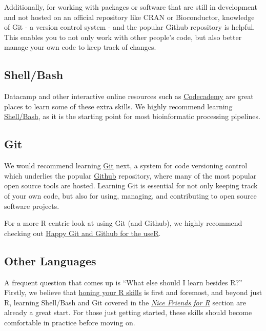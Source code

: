 \documentclass[]{book}
\begin{document}
Additionally, for working with packages or software that are still in development and not hosted on an official repository like CRAN or Bioconductor, knowledge of Git - a version control system - and the popular Github repository is helpful. This enables you to not only work with other people's code, but also better manage your own code to keep track of changes.

\hypertarget{shellbash}{%
\subsection{Shell/Bash}\label{shellbash}}

Datacamp and other interactive online resources such as \href{https://www.codecademy.com/catalog/subject/all}{Codecademy} are great places to learn some of these extra skills. We highly recommend learning \href{https://www.datacamp.com/courses/tech:shell}{Shell/Bash}, as it is the starting point for most bioinformatic processing pipelines.

\hypertarget{git}{%
\subsection{Git}\label{git}}

We would recommend learning \href{https://www.datacamp.com/courses/tech:git}{Git} next, a system for code versioning control which underlies the popular \href{https://Github.com}{Github} repository, where many of the most popular open source tools are hosted. Learning Git is essential for not only keeping track of your own code, but also for using, managing, and contributing to open source software projects.

For a more R centric look at using Git (and Github), we highly recommend checking out \href{https://happygitwithr.com/}{Happy Git and Github for the useR}.

\hypertarget{other-languages}{%
\subsection{Other Languages}\label{other-languages}}

A frequent question that comes up is ``What else should I learn besides R?'' Firstly, we believe that \protect\hyperlink{getting-started-with-r}{honing your R skills} is first and foremost, and beyond just R, learning Shell/Bash and Git covered in the \protect\hyperlink{nice-friends-for-r}{\emph{Nice Friends for R}} section are already a great start. For those just getting started, these skills should become comfortable in practice before moving on.
\end{document}
